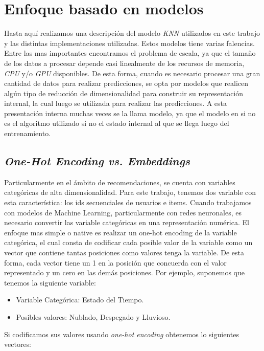 \documentclass[11pt,a4paper,twoside]{thesis}
\begin{document}
\section{Enfoque basado en modelos}

Hasta aquí realizamos una descripción del modelo \textit{KNN} utilizados en
este trabajo y las distintas implementaciones utilizadas. Estos modelos tiene
varias falencias. Entre las mas importantes encontramos el problema de escala,
ya que el tamaño de los datos a procesar depende casi linealmente de los
recursos de memoria, \textit{CPU} y/o \textit{GPU} disponibles. De esta forma,
cuando es necesario procesar una gran cantidad de datos para realizar
predicciones, se opta por modelos que realicen algún tipo de reducción de
dimensionalidad para construir su representación internal, la cual luego se
utilizada para realizar las predicciones. A esta presentación interna muchas
veces se la llama modelo, ya que el modelo en si no es el algoritmo utilizado
si no el estado internal al que se llega luego del entrenamiento.

\subsection{\textit{One-Hot Encoding vs. Embeddings}}

Particularmente en el ámbito de recomendaciones, se cuenta con variables
categóricas de alta dimensionalidad. Para este trabajo, tenemos dos variable
con esta característica: los ids secuenciales de usuarios e items. Cuando
trabajamos con modelos de Machine Learning, particularmente con redes
neuronales, es necesario convertir las variable categóricas en una
representación numérica. El enfoque mas simple o native es realizar un one-hot
encoding de la variable categórica, el cual consta de codificar cada posible
valor de la variable como un vector que contiene tantas posiciones como valores
tenga la variable. De esta forma, cada vector tiene un 1 en la posición que
concuerda con el valor representado y un cero en las demás posiciones. Por
ejemplo, suponemos que tenemos la siguiente variable:

\begin{itemize}
	\item Variable Categórica: Estado del Tiempo.
	\item Posibles valores: Nublado, Despegado y Lluvioso.
\end{itemize}

Si codificamos sus valores usando \textit{one-hot encoding} obtenemos lo
siguientes vectores:
\end{document}
